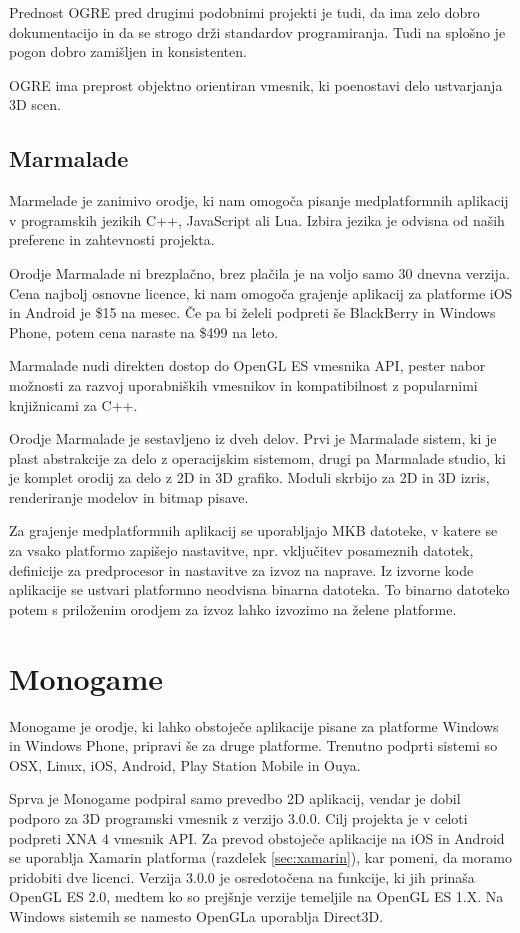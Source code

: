 Prednost OGRE pred drugimi podobnimi projekti je tudi, da ima zelo dobro dokumentacijo in da se strogo drži standardov programiranja. Tudi na splošno je pogon dobro zamišljen in konsistenten.

OGRE ima preprost objektno orientiran vmesnik, ki poenostavi delo ustvarjanja 3D scen.

\subsection{Marmalade}
\label{sec:marmalade}
Marmelade \cite{marmalade} je zanimivo orodje, ki nam omogoča pisanje medplatformnih aplikacij v programskih jezikih C++, JavaScript ali Lua. Izbira jezika je odvisna od naših preferenc in zahtevnosti projekta.

Orodje Marmalade ni brezplačno, brez plačila je na voljo samo 30 dnevna verzija. Cena najbolj osnovne licence, ki nam omogoča grajenje aplikacij za platforme iOS in Android je \$15 na mesec. Če pa bi želeli podpreti še BlackBerry in Windows Phone, potem cena naraste na \$499 na leto.

Marmalade nudi direkten dostop do OpenGL ES vmesnika API, pester nabor možnosti za razvoj uporabniških vmesnikov in kompatibilnost z popularnimi knjižnicami za C++. 

Orodje Marmalade je sestavljeno iz dveh delov. Prvi je Marmalade sistem, ki je plast abstrakcije za delo z operacijskim sistemom, drugi pa Marmalade studio, ki je komplet orodij za delo z 2D in 3D grafiko. Moduli skrbijo za 2D in 3D izris, renderiranje modelov in bitmap pisave.

Za grajenje medplatformnih aplikacij se uporabljajo MKB datoteke, v katere se za vsako platformo zapišejo nastavitve, npr. vključitev posameznih datotek, definicije za predprocesor in nastavitve za izvoz na naprave. Iz izvorne kode aplikacije se ustvari platformno neodvisna binarna datoteka. To binarno datoteko potem s priloženim orodjem za izvoz lahko izvozimo na želene platforme.

\section{Monogame}

Monogame je orodje, ki lahko obstoječe aplikacije pisane za platforme Windows in Windows Phone, pripravi še za druge platforme. Trenutno podprti sistemi so OSX, Linux, iOS, Android, Play Station Mobile in Ouya. 

Sprva je Monogame podpiral samo prevedbo 2D aplikacij, vendar je dobil podporo za 3D programski vmesnik z verzijo 3.0.0. Cilj projekta je v celoti podpreti XNA 4 vmesnik API. Za prevod obstoječe aplikacije na iOS in Android se uporablja Xamarin platforma (razdelek \ref{sec:xamarin}), kar pomeni, da moramo pridobiti dve licenci. Verzija 3.0.0 je osredotočena na funkcije, ki jih prinaša OpenGL ES 2.0, medtem ko so prejšnje verzije temeljile na OpenGL ES 1.X. Na Windows sistemih se namesto OpenGLa uporablja Direct3D.

